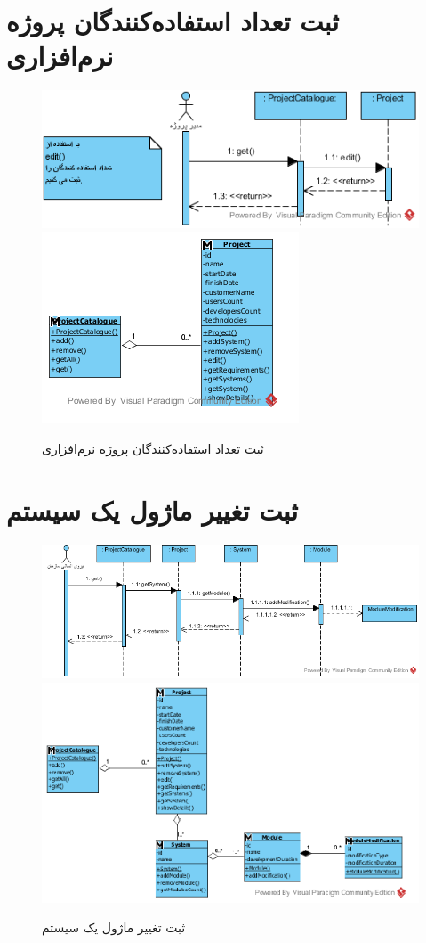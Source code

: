 \section{ثبت تعداد استفاده‌کنندگان پروژه نرم‌افزاری}
\begin{figure}[H]
	\centering
	\includegraphics[scale=0.8]{img/sequence-analysis/AddUsersCount}
	\includegraphics[scale=0.8]{img/sequence-analysis/AddUsersCountC}
	\caption{ثبت تعداد استفاده‌کنندگان پروژه نرم‌افزاری}
\end{figure}


\section{ثبت تغییر ماژول یک سیستم}
\begin{figure}[H]
	\centering
	\includegraphics[scale=0.7]{img/sequence-analysis/AddModuleModification}
	\includegraphics[scale=0.7]{img/sequence-analysis/AddModuleModificationC}
	\caption{ثبت تغییر ماژول یک سیستم}
\end{figure}


